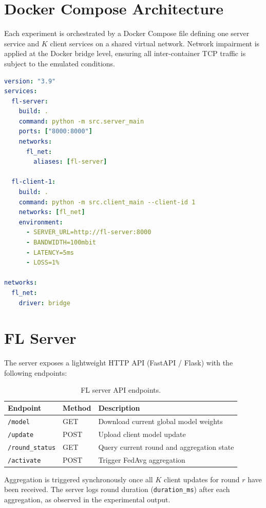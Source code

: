 \documentclass[12pt,a4paper]{report}
\begin{document}
\section{Docker Compose Architecture}

Each experiment is orchestrated by a Docker Compose file defining one server service and $K$ client services on a shared virtual network. Network impairment is applied at the Docker bridge level, ensuring all inter-container TCP traffic is subject to the emulated conditions.

\begin{lstlisting}[language=yaml, caption={Excerpt from compose.generated.yml}, label=lst:compose]
version: "3.9"
services:
  fl-server:
    build: .
    command: python -m src.server_main
    ports: ["8000:8000"]
    networks:
      fl_net:
        aliases: [fl-server]

  fl-client-1:
    build: .
    command: python -m src.client_main --client-id 1
    networks: [fl_net]
    environment:
      - SERVER_URL=http://fl-server:8000
      - BANDWIDTH=100mbit
      - LATENCY=5ms
      - LOSS=1%

networks:
  fl_net:
    driver: bridge
\end{lstlisting}

\section{FL Server}

The server exposes a lightweight HTTP API (FastAPI / Flask) with the following endpoints:

\begin{table}[H]
\centering
\caption{FL server API endpoints.}
\label{tab:api}
\begin{tabular}{lll}
\toprule
Endpoint & Method & Description \\
\midrule
\texttt{/model} & GET & Download current global model weights \\
\texttt{/update} & POST & Upload client model update \\
\texttt{/round\_status} & GET & Query current round and aggregation state \\
\texttt{/activate} & POST & Trigger FedAvg aggregation \\
\bottomrule
\end{tabular}
\end{table}

Aggregation is triggered synchronously once all $K$ client updates for round $r$ have been received. The server logs round duration (\texttt{duration\_ms}) after each aggregation, as observed in the experimental output.
\end{document}
